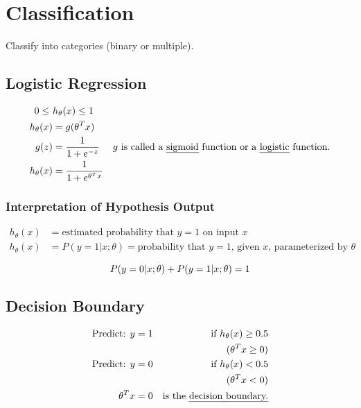 \chapter{Classification}
Classify into categories (binary or multiple).

\section{Logistic Regression}
\begin{align*}
    0 \le\      & h_\theta(x) \le 1                                               \\
    h_\theta(x) & = g(\theta^Tx)                                                  \\
    g(z)        & = \frac{1}{1 + e^{-z}}        &
    \text{$g$ is called a \emph{sigmoid} function or a \emph{logistic} function.} \\
    h_\theta(x) & = \frac{1}{1 + e^{\theta^Tx}}                                   \\
\end{align*}

\subsection*{Interpretation of Hypothesis Output}
\begin{align*}
    h_\theta(x) & = \text{estimated probability that $y = 1$ on input $x$} \\
    h_\theta(x) & = P(y = 1 | x; \theta) =
    \text{probability that $y = 1$, given $x$, parameterized by $\theta$}  \\
\end{align*}
\begin{equation*}
    P(y = 0 | x; \theta) + P(y = 1 | x; \theta) = 1                  \\
\end{equation*}

\section{Decision Boundary}
\begin{align*}
    \text{Predict: } y & = 1 & \text{ if } h_\theta(x) \ge 0.5         \\
                       &     & (\theta^Tx \ge 0)                       \\
    \text{Predict: } y & = 0 & \text{ if } h_\theta(x) < 0.5           \\
                       &     & (\theta^Tx < 0)                         \\
    \theta^Tx          & = 0 & \text{is the \emph{decision boundary.}} \\
\end{align*}

